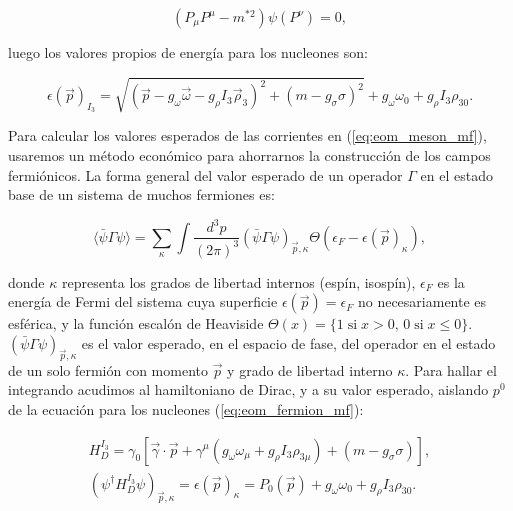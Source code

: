 \begin{equation}
	\left(P_\mu P^\mu - m^{*2}\right)\psi(P^\nu) = 0,
\end{equation}

luego los valores propios de energía para los nucleones son:

\begin{equation}
	\epsilon(\Vec{p})_{I_3} = \sqrt{(\Vec{p}-g_\omega \Vec{\omega}-g_\rho I_3\Vec{\rho}_{3})^2+(m-g_\sigma\sigma)^2} + g_\omega\omega_0 + g_\rho I_3\rho_{30}.
	\label{eq:particleenergy} 
\end{equation}

Para calcular los valores esperados de las corrientes en (\ref{eq:eom_meson_mf}), usaremos un método económico para ahorrarnos la construcción de los campos fermiónicos. La forma general del valor esperado de un operador $\Gamma$ en el estado base de un sistema de muchos fermiones es:

\begin{equation}
	\langle \bar{\psi} \Gamma \psi \rangle = \sum_{\kappa}\int \frac{d^3p}{(2\pi)^3} (\bar{\psi} \Gamma \psi)_{\Vec{p},\kappa} \Theta(\epsilon_F - \epsilon(\Vec{p})_\kappa),
	\label{eq:valor_esperado_general}
\end{equation}

donde $\kappa$ representa los grados de libertad internos (espín, isospín), $\epsilon_F$ es la energía de Fermi del sistema cuya superficie $\epsilon(\Vec{p})=\epsilon_F$ no necesariamente es esférica, y la función escalón de Heaviside $\Theta(x) = \{1 \; \text{si} \; x > 0,\, 0 \; \text{si} \; x \leq 0\}$. $(\bar{\psi} \Gamma \psi)_{\Vec{p},\kappa}$ es el valor esperado, en el espacio de fase, del operador en el estado de un solo fermión con momento $\Vec{p}$ y grado de libertad interno $\kappa$. Para hallar el integrando acudimos al hamiltoniano de Dirac, y a su valor esperado, aislando $p^0$ de la ecuación para los nucleones (\ref{eq:eom_fermion_mf}):

\begin{equation}
	\begin{gathered}
		H_D^{I_3} = \gamma_0\left[\Vec{\gamma}\cdot\Vec{p} + \gamma^\mu(g_\omega \omega_\mu + g_\rho I_3\rho_{3\mu})+(m-g_\sigma\sigma)\right],\\
		(\psi^\dagger H_D^{I_3} \psi)_{\Vec{p},\kappa} = \epsilon(\Vec{p})_{\kappa} = P_0(\Vec{p}) + g_\omega\omega_0+g_\rho I_3\rho_{30}.
		\label{eq:hamiltonian}
	\end{gathered}
\end{equation}

